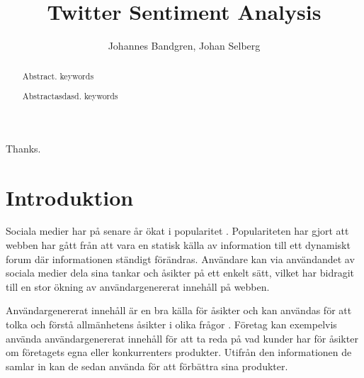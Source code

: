 \documentclass{kaumasters} %
\title{Twitter Sentiment Analysis}
\author{Johannes Bandgren, Johan Selberg}
\institute{Department of Computer Science}
\begin{document}



\maketitle

\frontmatter
\approvalpage%

\begin{abstract}
  Abstract.
  \keywords keywords
\end{abstract}

\begin{abstract}
  Abstractasdasd.
  \keywords keywords
\end{abstract}




\begin{acknowledgements}
  Thanks.
\end{acknowledgements}

\tableofcontents{}
\listoffigures
\listoftables
\lstlistoflistings

\mainmatter
\pagestyle{fancy}
\fancyhead[LE,RO]{\thepage}
\fancyhead[RE,LO]{\rightmark}
\fancyfoot{}
\chapter{Introduktion}
Sociala medier har på senare år ökat i popularitet \cite{TSAsurvey}. Populariteten har gjort att webben har gått från att vara en statisk källa av information till ett dynamiskt forum där informationen ständigt förändras. Användare kan via användandet av sociala medier dela sina tankar och åsikter på ett enkelt sätt, vilket har bidragit till en stor ökning av användargenererat innehåll på webben. 

Användargenererat innehåll är en bra källa för åsikter och kan användas för att tolka och förstå allmänhetens åsikter i olika frågor \cite{TSAsurvey}. Företag kan exempelvis använda användargenererat innehåll för att ta reda på vad kunder har för åsikter om företagets egna eller konkurrenters produkter. Utifrån den informationen de samlar in kan de sedan använda för att förbättra sina produkter. 
\end{document}

